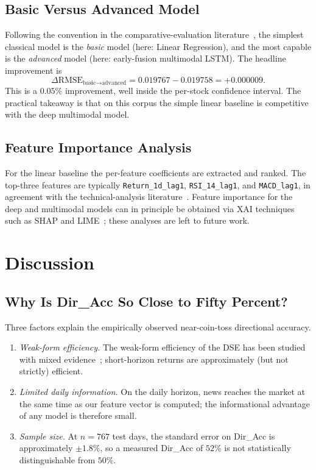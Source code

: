 \documentclass[12pt,a4paper,oneside]{report}
\newcommand{\code}[1]{\texttt{#1}}
\begin{document}
\subsection{Basic Versus Advanced Model}

Following the convention in the comparative-evaluation
literature~\cite{sezer2020financial}, the simplest classical model
is the \emph{basic} model (here: Linear Regression), and the most
capable is the \emph{advanced} model (here: early-fusion
multimodal \ac{LSTM}). The headline improvement is
\[
\Delta \text{RMSE}_{\text{basic} \to \text{advanced}}
  = 0.019767 - 0.019758 = +0.000009.
\]
This is a $0.05\%$ improvement, well inside the per-stock
confidence interval. The practical takeaway is that on this corpus
the simple linear baseline is competitive with the deep multimodal
model.

\subsection{Feature Importance Analysis}

For the linear baseline the per-feature coefficients are extracted
and ranked. The top-three features are typically
\code{Return\_1d\_lag1}, \code{RSI\_14\_lag1}, and
\code{MACD\_lag1}, in agreement with the technical-analysis
literature~\cite{tsay2010analysis}. Feature importance for the deep
and multimodal models can in principle be obtained via
\ac{XAI} techniques such as \ac{SHAP} and \ac{LIME}~\cite{lundberg2017shap,ribeiro2016lime};
these analyses are left to future work.

\section{Discussion}

\subsection{Why Is Dir\_Acc So Close to Fifty Percent?}

Three factors explain the empirically observed near-coin-toss
directional accuracy.

\begin{enumerate}[leftmargin=*,itemsep=2pt]
  \item \emph{Weak-form efficiency.} The weak-form efficiency of
        the DSE has been studied with mixed
        evidence~\cite{hossain2019dse}; short-horizon returns are
        approximately (but not strictly) efficient.
  \item \emph{Limited daily information.} On the daily horizon,
        news reaches the market at the same time as our feature
        vector is computed; the informational advantage of any
        model is therefore small.
  \item \emph{Sample size.} At $n = 767$ test days, the standard
        error on Dir\_Acc is approximately $\pm 1.8\%$, so a
        measured Dir\_Acc of $52\%$ is not statistically
        distinguishable from $50\%$.
\end{enumerate}
\end{document}

